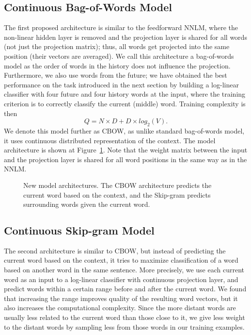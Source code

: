 \documentclass{article} %
\begin{document}
\subsection{Continuous Bag-of-Words Model}

The first proposed architecture is similar to the feedforward NNLM, where the non-linear hidden layer is removed and the projection layer is shared for all words (not just the projection matrix); thus, all words get projected
into the same position (their vectors are averaged). We call this architecture a bag-of-words model as the order of words in the history does not influence the projection.
Furthermore, we also use words from the future; we have obtained the best performance on the task introduced in the next section by building a log-linear classifier with four future and four history words at the input,
where the training criterion is to correctly classify the current (middle) word. Training complexity is then
\begin{equation}
Q = N \times D + D \times log_{2}(V).
\label{eq1}
\end{equation}
We denote this model further as CBOW, as unlike standard bag-of-words model, it uses continuous distributed representation of the context. The model architecture is shown at Figure~\ref{fig-models}. Note that the weight
matrix between the input and the projection layer is shared for all word positions in the same way as in the NNLM.

\begin{figure}[tb]
\centering
\centerline{}
\caption{New model architectures. The CBOW architecture predicts the current word based on the context, and the Skip-gram predicts surrounding words given the current word.}
\label{fig-models}
\end{figure}

\subsection{Continuous Skip-gram Model}

The second architecture is similar to CBOW, but instead of predicting the current word based on the context, it tries to maximize classification of a word based on another word in the same sentence. More precisely, we use each current
word as an input to a log-linear classifier with continuous projection layer, and predict words within a certain range before and after the current word. We found that increasing the range improves quality of the resulting word vectors,
but it also increases the computational complexity. Since the more distant words are usually less related to the current word than those close to it, we give less weight to the distant words by sampling less from
those words in our training examples.%
\end{document}
